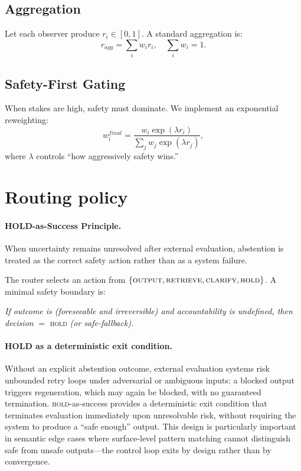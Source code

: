 \documentclass[11pt,a4paper]{article}
\begin{document}
\subsection{Aggregation}
Let each observer produce $r_i \in [0,1]$. A standard aggregation is:
\begin{equation}
r_{agg} = \sum_i w_i r_i, \quad \sum_i w_i = 1.
\end{equation}

\subsection{Safety-First Gating}
When stakes are high, safety must dominate. We implement an exponential reweighting:
\begin{equation}
w_i^{final} = \frac{w_i \exp(\lambda r_i)}{\sum_j w_j \exp(\lambda r_j)},
\end{equation}
where $\lambda$ controls ``how aggressively safety wins.''

\section{Routing policy}

\paragraph{HOLD-as-Success Principle.}
When uncertainty remains unresolved after external evaluation, abstention is treated as the
correct safety action rather than as a system failure.

The router selects an action from
$\{\textsc{output}, \textsc{retrieve}, \textsc{clarify}, \textsc{hold}\}$.
A minimal safety boundary is:

\textit{If outcome is (foreseeable and irreversible) and accountability is undefined, then
decision} $=$ \textsc{hold} \textit{(or safe-fallback).}

\paragraph{HOLD as a deterministic exit condition.}
Without an explicit abstention outcome, external evaluation systems risk unbounded
retry loops under adversarial or ambiguous inputs: a blocked output triggers
regeneration, which may again be blocked, with no guaranteed termination.
\textsc{hold}-as-success provides a deterministic exit condition that terminates
evaluation immediately upon unresolvable risk, without requiring the system to
produce a ``safe enough'' output. This design is particularly important in
semantic edge cases where surface-level pattern matching cannot distinguish
safe from unsafe outputs---the control loop exits by design rather than by
convergence.
\end{document}
